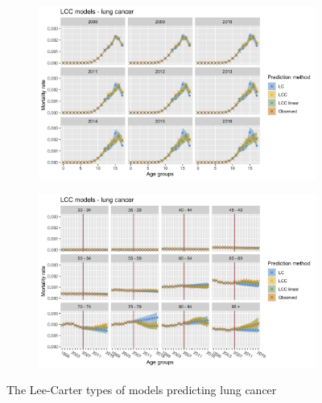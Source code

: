 \begin{figure}[h!]
    \centering
    \begin{subfigure}[b]{.45\linewidth}
        \includegraphics[width=\linewidth]{real-data/real-data-univariate/Figures/univariate-LCC-by-age-lung.png}
    \end{subfigure}
    \begin{subfigure}[b]{.45\linewidth}
        \includegraphics[width=\linewidth]{real-data/real-data-univariate/Figures/univariate-LCC-by-period-lung.png}
    \end{subfigure}
    \caption{The Lee-Carter types of models predicting lung cancer}
    \label{fig:uv-LCC-lung}
\end{figure}

